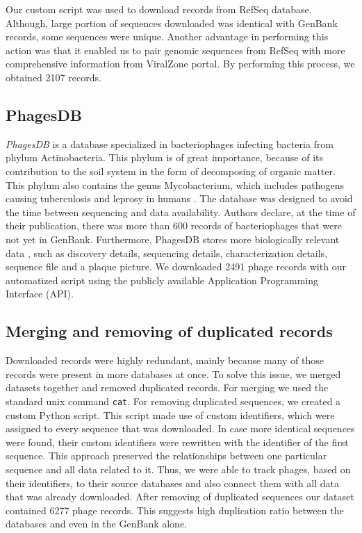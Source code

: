 Our custom script was used to download records from RefSeq database.
Although, large portion of sequences downloaded was identical with GenBank records, some sequences were unique.
Another advantage in performing this action was that it enabled us to pair genomic sequences from RefSeq with more comprehensive information from ViralZone portal.
By performing this process, we obtained 2107 records.


\subsection{PhagesDB}
\emph{PhagesDB} is a database specialized in bacteriophages infecting bacteria from phylum Actinobacteria.
This phylum is of great importance, because of its contribution to the soil system in the form of decomposing of organic matter.
This phylum also contains the genus Mycobacterium, which includes pathogens causing tuberculosis and leprosy in humans \cite{mycobacterium}.
The database was designed to avoid the time between sequencing and data availability.
Authors declare, at the time of their publication, there was more than 600 records of bacteriophages that were not yet in GenBank.
Furthermore, PhagesDB stores more biologically relevant data , such as discovery details, sequencing details, characterization details, sequence file and a plaque picture.
We downloaded 2491 phage records with our automatized script using the publicly available Application Programming Interface (API).

\subsection{Merging and removing of duplicated records}
Downloaded records were  highly redundant, mainly because many of those records were present in  more databases at once.
To solve this issue, we merged datasets together and removed duplicated records.
For merging we used the standard unix command \verb|cat|.
For removing duplicated sequences, we created a custom Python script.
This script made use of custom identifiers, which were assigned to every sequence that was downloaded.
In case more identical sequences were found, their custom identifiers were rewritten with the identifier of the first sequence.
This approach preserved the relationships between one particular sequence and all data related to it.
Thus, we were able to track phages, based on their identifiers, to their source databases and also connect them with all data that was already downloaded.
After removing of duplicated sequences our dataset contained 6277 phage records.
This suggests high duplication ratio between the databases and even in the GenBank alone.

